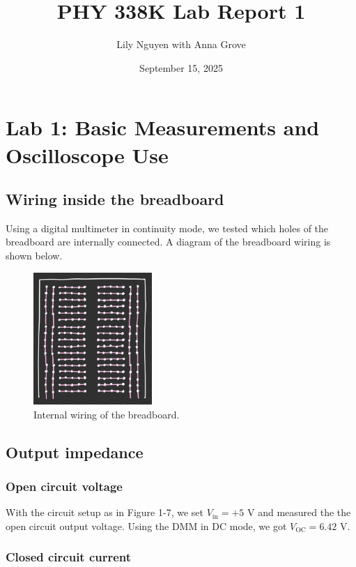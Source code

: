 \documentclass{article}
\title{PHY 338K Lab Report 1}
\author{Lily Nguyen with Anna Grove}
\date{September 15, 2025}
\begin{document}
\maketitle

\section{Lab 1: Basic Measurements and Oscilloscope Use}

\subsection{Wiring inside the breadboard}

Using a digital multimeter in continuity mode, we tested which holes of the breadboard are internally connected. A diagram of the breadboard wiring is shown below.

\begin{figure}[h!]
    \centering
    \includegraphics[width=0.4\textwidth]{breadboard.png}
    \caption{Internal wiring of the breadboard.}
    \label{fig:breadboard}
\end{figure}

\subsection{Output impedance}

\subsubsection{Open circuit voltage}

With the circuit setup as in Figure 1-7, we set $V_{\text{in}}=+5 \text{ V}$ and measured the the open circuit output voltage. Using the DMM in DC mode, we got $V_{\text{OC}}=6.42\text{ V}$.

\subsubsection{Closed circuit current}
\end{document}
